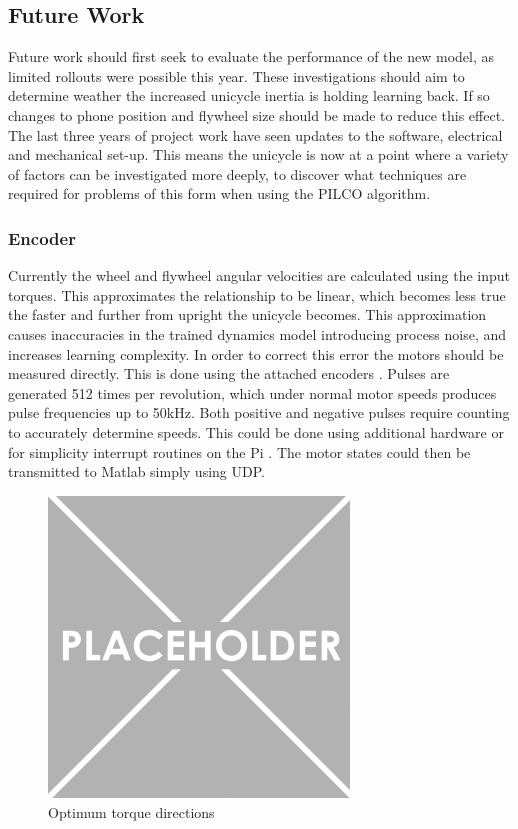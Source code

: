 \documentclass[twoside,twocolumn,12pt]{article}
\begin{document}
\subsection{Future Work}
Future work should first seek to evaluate the performance of the new model, as limited rollouts were possible this year. These investigations should aim to determine weather the increased unicycle inertia is holding learning back. If so changes to phone position and flywheel size should be made to reduce this effect.
\newline
The last three years of project work have seen updates to the software, electrical and mechanical set-up. This means the unicycle is now at a point where a variety of factors can be investigated more deeply, to discover what techniques are required for problems of this form when using the PILCO algorithm. 
\subsubsection{Encoder}
Currently the wheel and flywheel angular velocities are calculated using the input torques. This approximates the relationship to be linear, which becomes less true the faster and further from upright the unicycle becomes. This approximation causes inaccuracies in the trained dynamics model introducing process noise, and increases learning complexity. 
\newline
In order to correct this error the motors should be measured directly. This is done using the attached encoders \cite{encoder}. Pulses are generated 512 times per revolution, which under normal motor speeds produces pulse frequencies up to 50kHz.
\newline
Both positive and negative pulses require counting to accurately determine speeds. This could be done using additional hardware or for simplicity interrupt routines on the Pi \cite{interrupt}. The motor states could then be transmitted to Matlab simply using UDP.

\begin{figure}
  \centering
    \includegraphics[width=\linewidth,height = 8cm]{place}
  \caption{Optimum torque directions}
  \label{fig:quad}
\end{figure} 
\end{document}
